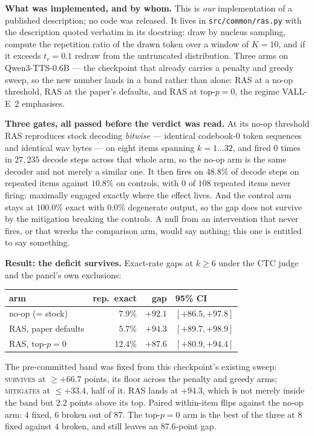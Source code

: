 \documentclass[11pt]{article}
\begin{document}
\textbf{What was implemented, and by whom.} This is \emph{our} implementation of
a published description; no code was released. It lives in
\texttt{src/common/ras.py} with the description quoted verbatim in its docstring:
draw by nucleus sampling, compute the repetition ratio of the drawn token over a
window of $K{=}10$, and if it exceeds $t_r{=}0.1$ redraw from the untruncated
distribution. Three arms on Qwen3-TTS-0.6B --- the checkpoint that already
carries a penalty and greedy sweep, so the new number lands in a band rather than
alone: RAS at a no-op threshold, RAS at the paper's defaults, and RAS at
$\text{top-}p{=}0$, the regime VALL-E~2 emphasises.

\textbf{Three gates, all passed before the verdict was read.} At its no-op
threshold RAS reproduces stock decoding \emph{bitwise} --- identical codebook-0
token sequences and identical wav bytes --- on eight items spanning
$k{=}1\ldots32$, and fired $0$ times in $27{,}235$ decode steps across that whole
arm, so the no-op arm is the same decoder and not merely a similar one. It then
fires on $48.8\%$ of decode steps on repeated items against $10.8\%$ on controls,
with $0$ of $108$ repeated items never firing: maximally engaged exactly where
the effect lives. And the control arm stays at $100.0\%$ exact with $0.0\%$
degenerate output, so the gap does not survive by the mitigation breaking the
controls. A null from an intervention that never fires, or that wrecks the
comparison arm, would say nothing; this one is entitled to say something.

\textbf{Result: the deficit survives.} Exact-rate gaps at $k\ge6$ under the CTC
judge and the panel's own exclusions:

\begin{center}
\begin{tabular}{@{}lrrl@{}}
\toprule
arm & rep.\ exact & gap & 95\% CI \\
\midrule
no-op (= stock)          & 7.9\%  & $+92.1$ & $[+86.5, +97.8]$ \\
RAS, paper defaults      & 5.7\%  & $+94.3$ & $[+89.7, +98.9]$ \\
RAS, $\text{top-}p{=}0$  & 12.4\% & $+87.6$ & $[+80.9, +94.4]$ \\
\bottomrule
\end{tabular}
\end{center}

\noindent The pre-committed band was fixed from this checkpoint's existing sweep:
\textsc{survives} at $\ge +66.7$ points, its floor across the penalty and greedy
arms; \textsc{mitigates} at $\le +33.4$, half of it. RAS lands at $+94.3$, which
is not merely inside the band but $2.2$ points above its top. Paired within-item
flips against the no-op arm: $4$ fixed, $6$ broken out of $87$. The
$\text{top-}p{=}0$ arm is the best of the three at $8$ fixed against $4$ broken,
and still leaves an $87.6$-point gap.
\end{document}
